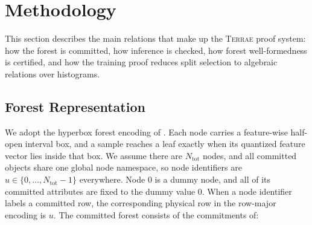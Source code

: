 \section{Methodology}\label{sec:methodology}

This section describes the main relations that make up the \textsc{Terrae}
proof system: how the forest is committed, how inference is checked, how forest
well-formedness is certified, and how the training proof reduces split
selection to algebraic relations over histograms.

\subsection{Forest Representation}\label{subsec:method-forest-representation}

We adopt the hyperbox forest encoding of \cite{cq++24}. Each node carries a
feature-wise half-open interval box, and a sample reaches a leaf exactly when
its quantized feature vector lies inside that box. 
We assume there are $N_{\mathrm{tot}}$ nodes, and
all committed objects share
one global node namespace, so node identifiers are
$u \in \{0,\ldots,N_{\mathrm{tot}}-1\}$ everywhere. Node $0$ is a dummy node, and
all of its committed attributes are fixed to the dummy value $0$. When a node identifier labels
a committed row, the corresponding physical row in the row-major encoding is
$u$. The committed
forest consists of the commitments of:
